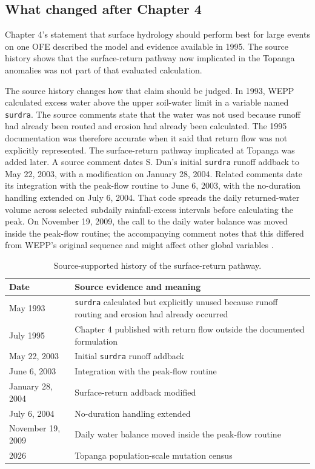 \documentclass[11pt]{article}
\newcommand{\surdra}{\texttt{surdra}}
\begin{document}
\subsection{What changed after Chapter 4}

Chapter 4's statement that surface hydrology should perform best for large
events on one OFE described the model and evidence available in 1995. The
source history shows that the surface-return pathway now implicated in the
Topanga anomalies was not part of that evaluated calculation.

The source history changes how that claim should be judged. In 1993, WEPP
calculated excess water above the upper soil-water limit in a variable named
\texttt{surdra}. The source comments state that the water was not used because
runoff had already been routed and erosion had already been calculated. The
1995 documentation was therefore accurate when it said that return flow was
not explicitly represented. The surface-return pathway implicated at Topanga
was added later. A source comment dates S. Dun's initial \texttt{surdra}
runoff addback to May 22, 2003, with a modification on January 28, 2004.
Related comments date its integration with the peak-flow routine to June 6,
2003, with the no-duration handling extended on July 6, 2004. That code spreads
the daily returned-water volume across selected subdaily rainfall-excess
intervals before calculating the peak. On November 19, 2009, the call to the
daily water balance was moved inside the peak-flow routine; the accompanying
comment notes that this differed from WEPP's original sequence and might affect
other global variables \cite{stakeholder}.

\begin{table}[H]
  \centering
  \small
  \caption{Source-supported history of the surface-return pathway.}
  \label{tab:surdra-history}
  \begin{tabular}{lp{}}
    \toprule
    Date & Source evidence and meaning \\
    \midrule
    May 1993 & \surdra{} calculated but explicitly unused because runoff routing and erosion had already occurred \\
    July 1995 & Chapter 4 published with return flow outside the documented formulation \\
    May 22, 2003 & Initial \surdra{} runoff addback \\
    June 6, 2003 & Integration with the peak-flow routine \\
    January 28, 2004 & Surface-return addback modified \\
    July 6, 2004 & No-duration handling extended \\
    November 19, 2009 & Daily water balance moved inside the peak-flow routine \\
    2026 & Topanga population-scale mutation census \\
    \bottomrule
  \end{tabular}
\end{table}
\end{document}

